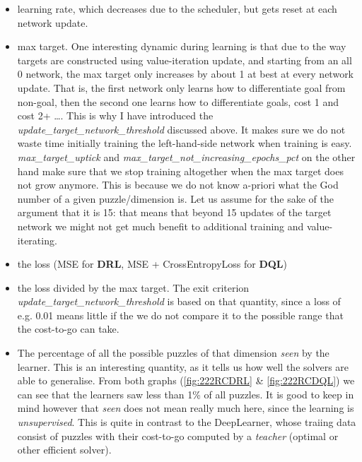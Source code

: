\begin{itemize}
\item learning rate, which decreases due to the scheduler, but gets reset at each network update.
\item max target. One interesting dynamic during learning is that due to the way targets are constructed using value-iteration update, and starting from an all 0 network, the max target only increases by about 1 at best at every network update. That is, the first network only learns how to differentiate goal from non-goal, then the second one learns how to differentiate goals, cost 1 and cost 2+ \dots. This is why I have introduced the \textit{update\_target\_network\_threshold} discussed above. It makes sure we do not waste time initially training the left-hand-side network when training is easy. \textit{max\_target\_uptick} and \textit{max\_target\_not\_increasing\_epochs\_pct} on the other hand make sure that we stop training altogether when the max target does not grow anymore. This is because we do not know a-priori what the God number of a given puzzle/dimension is. Let us assume for the sake of the argument that it is 15: that means that beyond 15 updates of the target network we might not get much benefit to additional training and value-iterating.
\item the loss (MSE for \textbf{DRL}, MSE + CrossEntropyLoss for \textbf{DQL})
\item the loss divided by the max target. The exit criterion \textit{update\_target\_network\_threshold} is based on that quantity, since a loss of e.g. 0.01 means little if the we do not compare it to the possible range that the cost-to-go can take.
\item The percentage of all the possible puzzles of that dimension \textit{seen} by the learner. This is an interesting quantity, as it tells us how well the solvers are able to generalise. From both graphs (\ref{fig:222RCDRL} \& \ref{fig:222RCDQL}) we can see that the learners saw less than 1\% of all puzzles. It is good to keep in mind however that \textit{seen} does not mean really much here, since the learning is \textit{unsupervised}. This is quite in contrast to the DeepLearner, whose traiing data consist of puzzles with their cost-to-go computed by a \textit{teacher} (optimal or other efficient solver).
\end{itemize}


